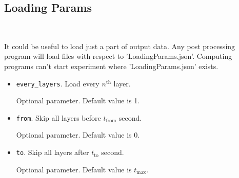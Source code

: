 \subsection{Loading Params}\

It could be useful to load just a part of output data.
%
Any post processing program will load files with respect to 'LoadingParams.json'. 
%
Computing programs can't start experiment where 'LoadingParams.json' exists.

\begin{itemize}
    \item \verb|every_layers|. Load every $n^{\text{th}}$ layer.

    Optional parameter. Default value is 1.
    \item \verb|from|. Skip all layers before $t_{\text{from}}$ second. 

    Optional parameter. Default value is 0.
    
    \item \verb|to|. Skip all layers after $t_{\text{to}}$ second.

    Optional parameter. Default value is $t_{\text{max}}$.
\end{itemize}